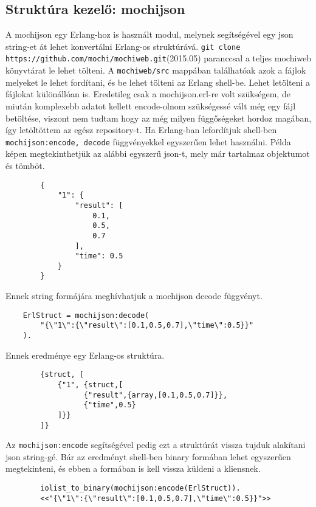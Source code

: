 \subsection{Struktúra kezelő: mochijson}
	A mochijson egy Erlang-hoz is használt modul, melynek segítségével egy json string-et át lehet konvertálni Erlang-os struktúrává. \newline 
	\texttt{git clone https://github.com/mochi/mochiweb.git}(2015.05)
	paranccsal a teljes mochiweb könyvtárat le lehet tölteni. A \texttt{mochiweb/src} mappában találhatóak azok a fájlok melyeket le lehet fordítani, és be lehet tölteni az Erlang shell-be. Lehet letölteni a fájlokat különállóan is. \newline
	Eredetileg csak a mochijson.erl-re volt szükségem, de miután komplexebb adatot kellett encode-olnom szükségessé vált még egy fájl betöltése, viszont nem tudtam hogy az még milyen függőségeket hordoz magában, így letöltöttem az egész repository-t. \newline
	Ha Erlang-ban lefordítjuk shell-ben \texttt{mochijson:encode, decode} függvényekkel egyszerűen lehet használni.\newline 
	Példa képen megtekinthetjük az alábbi egyszerű json-t, mely már tartalmaz objektumot és tömböt.
	\begin{verbatim}
		{
		    "1": {
		        "result": [
		            0.1,
		            0.5,
		            0.7
		        ],
		        "time": 0.5
		    }
		}
	\end{verbatim}
	Ennek string formájára meghívhatjuk a mochijson decode függvényt.
	\begin{verbatim}
	ErlStruct = mochijson:decode(
	    "{\"1\":{\"result\":[0.1,0.5,0.7],\"time\":0.5}}"
	).
	\end{verbatim}
	Ennek eredménye egy Erlang-os struktúra.
	\begin{verbatim}
		{struct, [
		    {"1", {struct,[
		          {"result",{array,[0.1,0.5,0.7]}},
		          {"time",0.5}
		    ]}}
		]}
	\end{verbatim}
	Az \texttt{mochijson:encode} segítségével pedig ezt a struktúrát vissza tujduk alakítani json string-gé. Bár az eredményt shell-ben binary formában lehet egyszerűen megtekinteni, és ebben a formában is kell vissza küldeni a kliensnek. 
	\begin{verbatim}
		iolist_to_binary(mochijson:encode(ErlStruct)).
		<<"{\"1\":{\"result\":[0.1,0.5,0.7],\"time\":0.5}}">>
	\end{verbatim}


